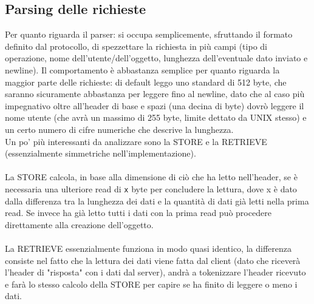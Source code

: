\subsection{Parsing delle richieste}
\begin{flushleft}
Per quanto riguarda il parser: si occupa semplicemente, sfruttando il formato definito dal protocollo, di spezzettare la richiesta in più campi (tipo di operazione, nome dell'utente/dell'oggetto, lunghezza dell'eventuale dato inviato e newline). Il comportamento è abbastanza semplice per quanto riguarda la maggior parte delle richieste: di default leggo uno standard di 512 byte, che saranno sicuramente abbastanza per leggere fino al newline, dato che al caso più impegnativo oltre all'header di base e spazi (una decina di byte) dovrò leggere il nome utente (che avrà un massimo di 255 byte, limite dettato da UNIX stesso) e un certo numero di cifre numeriche che descrive la lunghezza.\\Un po' più interessanti da analizzare sono la STORE e la RETRIEVE (essenzialmente simmetriche nell'implementazione).\\~\\

La STORE calcola, in base alla dimensione di ciò che ha letto nell'header, se è necessaria una ulteriore read di \texttt{x} byte per concludere la lettura, dove x è dato dalla differenza tra la lunghezza dei dati e la quantità di dati già letti nella prima read. Se invece ha già letto tutti i dati con la prima read può procedere direttamente alla creazione dell'oggetto.
\\~\\
La RETRIEVE essenzialmente funziona in modo quasi identico, la differenza consiste nel fatto che la lettura dei dati viene fatta dal client (dato che riceverà l'header di "risposta" con i dati dal server), andrà a tokenizzare l'header ricevuto e farà lo stesso calcolo della STORE per capire se ha finito di leggere o meno i dati. 

\end{flushleft}

